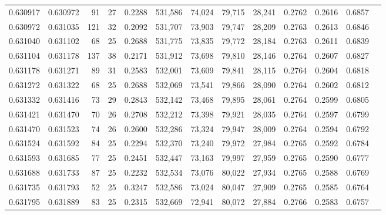 \begin{tabular}{rrrrrrrrrrrrr}
0.630917 & 0.630972 &  91 &  27 &                                     0.2288 & 531,586 &  74,024 &  79,715 &  28,241 & 0.2762 & 0.2616 & 0.6857 \\
0.630972 & 0.631035 & 121 &  32 &                                     0.2092 & 531,707 &  73,903 &  79,747 &  28,209 & 0.2763 & 0.2613 & 0.6846 \\
0.631040 & 0.631102 &  68 &  25 &                                     0.2688 & 531,775 &  73,835 &  79,772 &  28,184 & 0.2763 & 0.2611 & 0.6839 \\
0.631104 & 0.631178 & 137 &  38 &                                     0.2171 & 531,912 &  73,698 &  79,810 &  28,146 & 0.2764 & 0.2607 & 0.6827 \\
0.631178 & 0.631271 &  89 &  31 &                                     0.2583 & 532,001 &  73,609 &  79,841 &  28,115 & 0.2764 & 0.2604 & 0.6818 \\
0.631272 & 0.631322 &  68 &  25 &                                     0.2688 & 532,069 &  73,541 &  79,866 &  28,090 & 0.2764 & 0.2602 & 0.6812 \\
0.631332 & 0.631416 &  73 &  29 &                                     0.2843 & 532,142 &  73,468 &  79,895 &  28,061 & 0.2764 & 0.2599 & 0.6805 \\
0.631421 & 0.631470 &  70 &  26 &                                     0.2708 & 532,212 &  73,398 &  79,921 &  28,035 & 0.2764 & 0.2597 & 0.6799 \\
0.631470 & 0.631523 &  74 &  26 &                                     0.2600 & 532,286 &  73,324 &  79,947 &  28,009 & 0.2764 & 0.2594 & 0.6792 \\
0.631524 & 0.631592 &  84 &  25 &                                     0.2294 & 532,370 &  73,240 &  79,972 &  27,984 & 0.2765 & 0.2592 & 0.6784 \\
0.631593 & 0.631685 &  77 &  25 &                                     0.2451 & 532,447 &  73,163 &  79,997 &  27,959 & 0.2765 & 0.2590 & 0.6777 \\
0.631688 & 0.631733 &  87 &  25 &                                     0.2232 & 532,534 &  73,076 &  80,022 &  27,934 & 0.2765 & 0.2588 & 0.6769 \\
0.631735 & 0.631793 &  52 &  25 &                                     0.3247 & 532,586 &  73,024 &  80,047 &  27,909 & 0.2765 & 0.2585 & 0.6764 \\
0.631795 & 0.631889 &  83 &  25 &                                     0.2315 & 532,669 &  72,941 &  80,072 &  27,884 & 0.2766 & 0.2583 & 0.6757 \\

\end{tabular}

